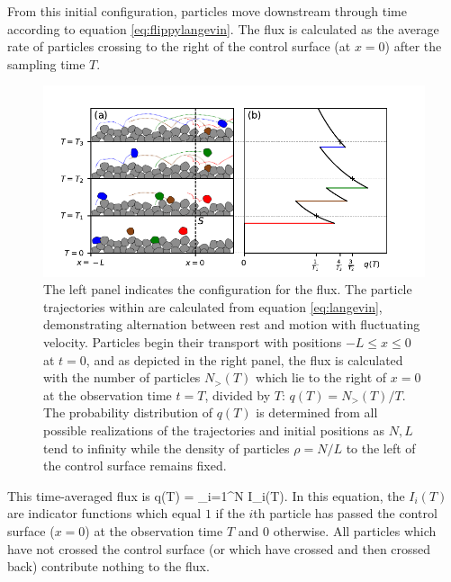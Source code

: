 From this initial configuration, particles move downstream through time according to equation \ref{eq:flippylangevin}.
The flux is calculated as the average rate of particles crossing to the right of the control surface (at $x=0$) after the sampling time $T$.
\begin{figure}
	\centerline{\includegraphics{./figures/ch2/figure1.pdf}}
	\caption{The left panel indicates the configuration for the flux. The particle trajectories within are calculated from equation \ref{eq:langevin}, demonstrating alternation between rest and motion with fluctuating velocity. Particles begin their transport with positions $-L\leq x \leq 0$ at $t=0$, and as depicted in the right panel, the flux is calculated with the number of particles $N_>(T)$ which lie to the right of $x=0$ at the observation time $t=T$, divided by $T$: $q(T) = N_>(T)/T$. The probability distribution of $q(T)$ is determined from all possible realizations of the trajectories and initial positions as $N,L$ tend to infinity while the density of particles $\rho=N/L$ to the left of the control surface remains fixed.}
	\label{fig:flipflopfig1}
\end{figure}
This time-averaged flux is
\be q(T) = \sum_{i=1}^N I_i(T). \label{eq:flippyflux} \ee
In this equation, the $I_i(T)$ are indicator functions which equal $1$ if the $i$th particle has passed the control surface ($x=0$) at the observation time $T$ and $0$ otherwise.
All particles which have not crossed the control surface (or which have crossed and then crossed back) contribute nothing to the flux.

